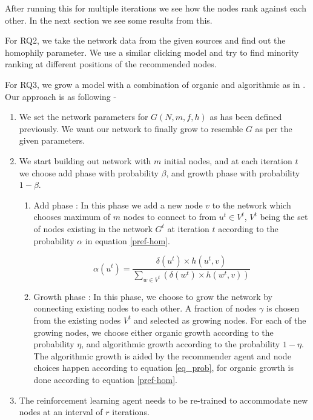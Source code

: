 {\setlength{\parindent}{0cm}
After running this for multiple iterations we see how the nodes rank against each other. In the next section we see some results from this.
}

\bigskip

For RQ2, we take the network data from the given sources and find out the homophily parameter. We use a similar clicking model and try to find minority ranking at different positions of the recommended nodes. 

\bigskip

For RQ3, we grow a model with a combination of organic and algorithmic as in \cite{stoica2018algorithmic}. Our approach is as following - 

\begin{enumerate}
	\item We set the network parameters for $G(N,m,f,h)$ as has been defined previously. We want our network to finally grow to resemble $G$ as per the given parameters. 
	
	\item We start building out network with $m$ initial nodes, and at each iteration $t$ we choose add phase with probability $\beta$, and growth phase with probability $1-\beta$.
	\begin{enumerate}
		\item Add phase : In this phase we add a new node $v$ to the network which chooses maximum of $m$ nodes to connect to from $u^{t} \in V^{t}$, $V^{t}$ being the set of nodes existing in the network $G^{t}$ at iteration $t$ according to the probability $\alpha$ in equation \ref{pref-hom}.
		
		\begin{equation}
		\alpha(u^{t}) = \frac{\delta(u^{t}) \times h(u^{t},v)}{\sum\limits_{w \in V^{t}} (\delta(w^{t}) \times h(w^{t},v))}
		\label{pref-hom}
		\end{equation}
		
		\item Growth phase : In this phase, we choose to grow the network by connecting existing nodes to each other. A fraction of nodes $\gamma$ is chosen from the existing nodes $V^{t}$ and selected as growing nodes. For each of the growing nodes, we choose either organic growth according to the probability $\eta$, and algorithmic growth according to the probability $1-\eta$. The algorithmic growth is aided by the recommender agent and node choices happen according to equation \ref{eq_prob}, for organic growth is done according to equation \ref{pref-hom}.
	\end{enumerate}

	\item The reinforcement learning agent needs to be re-trained to accommodate new nodes at an interval of $r$ iterations.
	
\end{enumerate}


